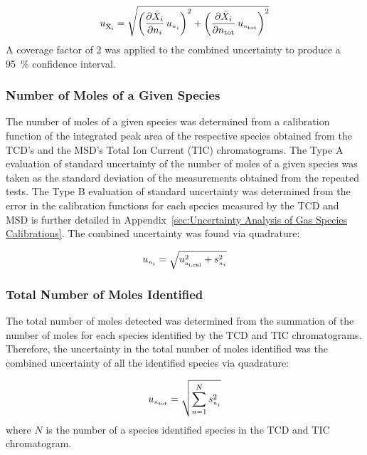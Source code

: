 \documentclass[12pt]{article}
\begin{document}
\begin{equation}
\label{eq:Volume_Frac_Uncertainty}
u_\mathrm{\bar{X}_{i}} = \sqrt{{\left( \frac{\partial \bar{X}_{i}}{\partial n_{i}}\,u_{\scriptscriptstyle n_{i}} \right)}^2+{\left(\frac{\partial \bar{X}_{i}}{\partial n_{\rm tot}}\,u_{\scriptscriptstyle n_{\rm tot}}\right)}^2}
\end{equation}
A coverage factor of 2 was applied to the combined uncertainty to produce a 95~\% confidence interval.

\subsubsection{Number of Moles of a Given Species}
\label{ssec:Number_of_Moles_of_a_Given_Species}

The number of moles of a given species was determined from a calibration function of the integrated peak area of the respective species obtained from the TCD's and the MSD's Total Ion Current (TIC) chromatograms. The Type A evaluation of standard uncertainty of the number of moles of a given species was taken as the standard deviation of the measurements obtained from the repeated tests. The Type B evaluation of standard uncertainty was determined from the error in the calibration functions for each species measured by the TCD and MSD is further detailed in Appendix~\ref{sec:Uncertainty Analysis of Gas Species Calibrations}. The combined uncertainty was found via quadrature:

\begin{equation}
\label{eq:gasspeciesuncertaintycertainty}
u_{\scriptscriptstyle n_{i}} = \sqrt{ u_{\rm \scriptscriptstyle n_{i,\rm cal}}^2 + s_{\scriptscriptstyle n_{i}}^2}
\end{equation}

\subsubsection{Total Number of Moles Identified}
\label{ssec:Total Number of Moles Identified}
The total number of moles detected was determined from the summation of the number of moles for each species identified by the TCD and TIC chromatograms. Therefore, the uncertainty in the total number of moles identified was the combined uncertainty of all the identified species via quadrature:

\begin{equation}
\label{eq:totalnumberofmolesdetected}
u_{\scriptscriptstyle n_{\rm tot}}=\sqrt{{\sum_{n=1}^{N} s_{\scriptscriptstyle n_{i}}^2}}
\end{equation}
where $N$ is the number of a species identified species in the TCD and TIC chromatogram.
\end{document}
